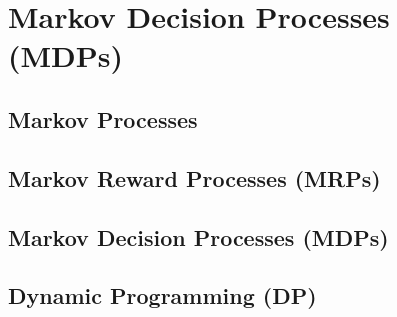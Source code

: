 \section{Markov Decision Processes (MDPs)}

\subsection{Markov Processes}

\subsection{Markov Reward Processes (MRPs)}

\subsection{Markov Decision Processes (MDPs)}

\subsection{Dynamic Programming (DP)}
